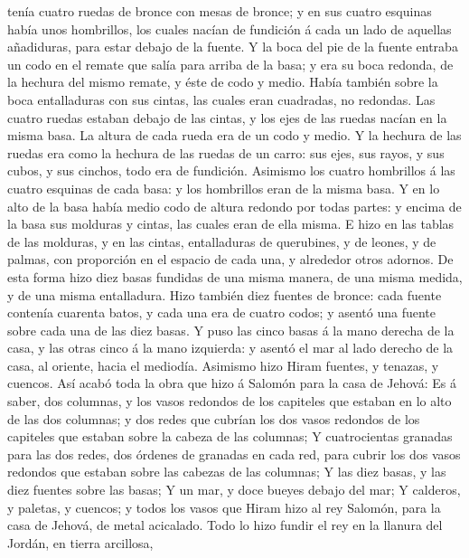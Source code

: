 tenía cuatro ruedas de bronce con mesas de bronce; y en sus cuatro
esquinas había unos hombrillos, los cuales nacían de fundición á cada un
lado de aquellas añadiduras, para estar debajo de la fuente.
 Y la boca del pie de la fuente entraba un codo en el
remate que salía para arriba de la basa; y era su boca redonda, de la
hechura del mismo remate, y éste de codo y medio. Había también sobre la
boca entalladuras con sus cintas, las cuales eran cuadradas, no
redondas.  Las cuatro ruedas estaban debajo de las cintas,
y los ejes de las ruedas nacían en la misma basa. La altura de cada
rueda era de un codo y medio.  Y la hechura de las ruedas
era como la hechura de las ruedas de un carro: sus ejes, sus rayos, y
sus cubos, y sus cinchos, todo era de fundición.  Asimismo
los cuatro hombrillos á las cuatro esquinas de cada basa: y los
hombrillos eran de la misma basa.  Y en lo alto de la basa
había medio codo de altura redondo por todas partes: y encima de la basa
sus molduras y cintas, las cuales eran de ella misma.  E
hizo en las tablas de las molduras, y en las cintas, entalladuras de
querubines, y de leones, y de palmas, con proporción en el espacio de
cada una, y alrededor otros adornos.  De esta forma hizo
diez basas fundidas de una misma manera, de una misma medida, y de una
misma entalladura.  Hizo también diez fuentes de bronce:
cada fuente contenía cuarenta batos, y cada una era de cuatro codos; y
asentó una fuente sobre cada una de las diez basas.  Y puso
las cinco basas á la mano derecha de la casa, y las otras cinco á la
mano izquierda: y asentó el mar al lado derecho de la casa, al oriente,
hacia el mediodía.  Asimismo hizo Hiram fuentes, y tenazas,
y cuencos. Así acabó toda la obra que hizo á Salomón para la casa de
Jehová:  Es á saber, dos columnas, y los vasos redondos de
los capiteles que estaban en lo alto de las dos columnas; y dos redes
que cubrían los dos vasos redondos de los capiteles que estaban sobre la
cabeza de las columnas;  Y cuatrocientas granadas para las
dos redes, dos órdenes de granadas en cada red, para cubrir los dos
vasos redondos que estaban sobre las cabezas de las columnas;
 Y las diez basas, y las diez fuentes sobre las basas;
 Y un mar, y doce bueyes debajo del mar;  Y
calderos, y paletas, y cuencos; y todos los vasos que Hiram hizo al rey
Salomón, para la casa de Jehová, de metal acicalado.  Todo
lo hizo fundir el rey en la llanura del Jordán, en tierra arcillosa,
